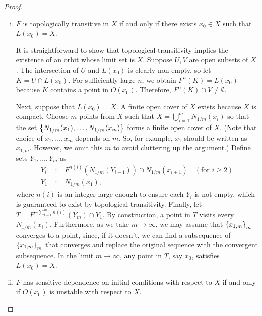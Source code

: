 \documentclass[11pt]{book}
\begin{document}
\begin{proof}
   \begin{enumerate}[(i)]
    \item $F$ is topologically transitive in $X$ if and only if there exists $x_0 \in X$ such that $L(x_0) = X$.

    It is straightforward to show that topological transitivity implies the existence of an orbit whose limit set is $X$.
    Suppose $U,V$ are open subsets of $X$.
    The intersection of $U$ and $L(x_0)$ is clearly non-empty, so let $K = U \cap L(x_0)$.
    For sufficiently large $n$, we obtain $F^n(K) = L(x_0)$ because $K$ contains a point in $O(x_0)$.
    Therefore, $F^n(K) \cap V \neq \emptyset$.

    Next, suppose that $L(x_0) = X$.
    A finite open cover of $X$ exists because $X$ is compact.
    Choose $m$ points from $X$ such that $X = \bigcup\limits_{i=1}^m N_{1/m}(x_i)$
    so that the set $\left \{ N_{1/m}(x_1), \ldots, N_{1/m}(x_m) \right \}$ forms a finite open cover of $X$.
    (Note that choice of $x_1, \ldots, x_m$ depends on $m$.
    So, for example, $x_1$ should be written as $x_{1,m}$.
    However, we omit this $m$ to avoid cluttering up the argument.)
    Define sets $Y_1, \ldots, Y_m$ as
    \begin{align*}
      Y_i &:= F^{n(i)}(N_{1/m}(Y_{i-1})) \cap N_{1/m}(x_{i+1}) \quad (\mbox{for } i \geq 2) \\
      Y_1 &:= N_{1/m}(x_1),
    \end{align*}
    where $n(i)$ is an integer large enough to ensure each $Y_i$ is not empty, which is guaranteed to exist by topological transitivity.
    Finally, let $T = F^{-\sum\limits_{i=1}^{m}n(i)}(Y_m) \cap Y_1$.
    By construction, a point in $T$ visits every $N_{1/m}(x_i)$.
    Furthermore, as we take $m \to \infty$, we may assume that $\left \{ x_{1,m} \right \}_m$ converges to a point, 
    since, if it doesn't, we can find a subsequence of $\left \{ x_{1,m} \right \}_m$ that converges and replace the original sequence with the convergent subsequence.
    In the limit $m \to \infty$, any point in $T$, say $x_0$, satisfies $L(x_0) = X$.

    \item $F$ has sensitive dependence on initial conditions with respect to $X$ if and only if $O(x_0)$ is unstable with respect to $X$.


\end{enumerate}
\end{proof}
\end{document}
